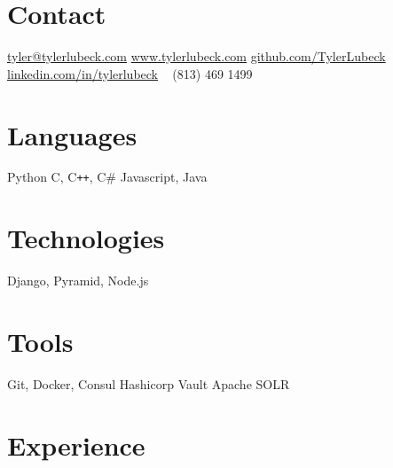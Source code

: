 \documentclass[print]{friggeri-cv} %
\begin{document}


\begin{aside} %
\section{Contact}
\href{mailto:tyler@tylerlubeck.com}{tyler@tylerlubeck.com}
\href{http://www.tylerlubeck.com}{www.tylerlubeck.com}
\href{http://www.github.com/TylerLubeck}{github.com/TylerLubeck}
\href{https://www.linkedin.com/in/tylerlubeck}{linkedin.com/in/tylerlubeck}
~
(813) 469 1499
\section{Languages}
Python
C, C{}\texttt{++}, C\#
Javascript, Java
\section{Technologies}
Django, Pyramid, Node.js
\section{Tools}
Git, Docker, Consul
Hashicorp Vault
Apache SOLR
\end{aside}


\section{Experience}
\end{document}
